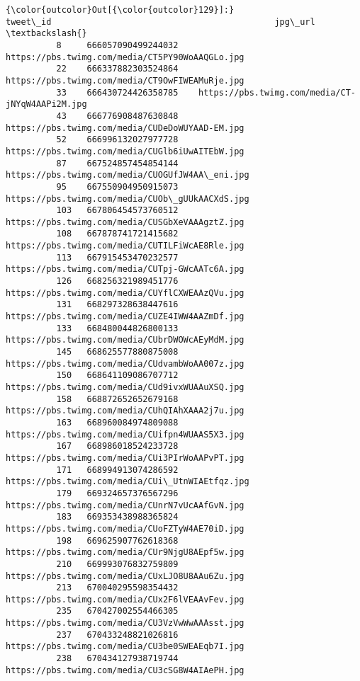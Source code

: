 \documentclass[11pt]{article}
\begin{document}
\begin{Verbatim}[commandchars=\\\{\}]
{\color{outcolor}Out[{\color{outcolor}129}]:}                 tweet\_id                                            jpg\_url  \textbackslash{}
          8     666057090499244032    https://pbs.twimg.com/media/CT5PY90WoAAQGLo.jpg   
          22    666337882303524864    https://pbs.twimg.com/media/CT9OwFIWEAMuRje.jpg   
          33    666430724426358785    https://pbs.twimg.com/media/CT-jNYqW4AAPi2M.jpg   
          43    666776908487630848    https://pbs.twimg.com/media/CUDeDoWUYAAD-EM.jpg   
          52    666996132027977728    https://pbs.twimg.com/media/CUGlb6iUwAITEbW.jpg   
          87    667524857454854144    https://pbs.twimg.com/media/CUOGUfJW4AA\_eni.jpg   
          95    667550904950915073    https://pbs.twimg.com/media/CUOb\_gUUkAACXdS.jpg   
          103   667806454573760512    https://pbs.twimg.com/media/CUSGbXeVAAAgztZ.jpg   
          108   667878741721415682    https://pbs.twimg.com/media/CUTILFiWcAE8Rle.jpg   
          113   667915453470232577    https://pbs.twimg.com/media/CUTpj-GWcAATc6A.jpg   
          126   668256321989451776    https://pbs.twimg.com/media/CUYflCXWEAAzQVu.jpg   
          131   668297328638447616    https://pbs.twimg.com/media/CUZE4IWW4AAZmDf.jpg   
          133   668480044826800133    https://pbs.twimg.com/media/CUbrDWOWcAEyMdM.jpg   
          145   668625577880875008    https://pbs.twimg.com/media/CUdvambWoAA007z.jpg   
          150   668641109086707712    https://pbs.twimg.com/media/CUd9ivxWUAAuXSQ.jpg   
          158   668872652652679168    https://pbs.twimg.com/media/CUhQIAhXAAA2j7u.jpg   
          163   668960084974809088    https://pbs.twimg.com/media/CUifpn4WUAAS5X3.jpg   
          167   668986018524233728    https://pbs.twimg.com/media/CUi3PIrWoAAPvPT.jpg   
          171   668994913074286592    https://pbs.twimg.com/media/CUi\_UtnWIAEtfqz.jpg   
          179   669324657376567296    https://pbs.twimg.com/media/CUnrN7vUcAAfGvN.jpg   
          183   669353438988365824    https://pbs.twimg.com/media/CUoFZTyW4AE70iD.jpg   
          198   669625907762618368    https://pbs.twimg.com/media/CUr9NjgU8AEpf5w.jpg   
          210   669993076832759809    https://pbs.twimg.com/media/CUxLJO8U8AAu6Zu.jpg   
          213   670040295598354432    https://pbs.twimg.com/media/CUx2F6lVEAAvFev.jpg   
          235   670427002554466305    https://pbs.twimg.com/media/CU3VzVwWwAAAsst.jpg   
          237   670433248821026816    https://pbs.twimg.com/media/CU3be0SWEAEqb7I.jpg   
          238   670434127938719744    https://pbs.twimg.com/media/CU3cSG8W4AIAePH.jpg   

\end{Verbatim}
\end{document}
